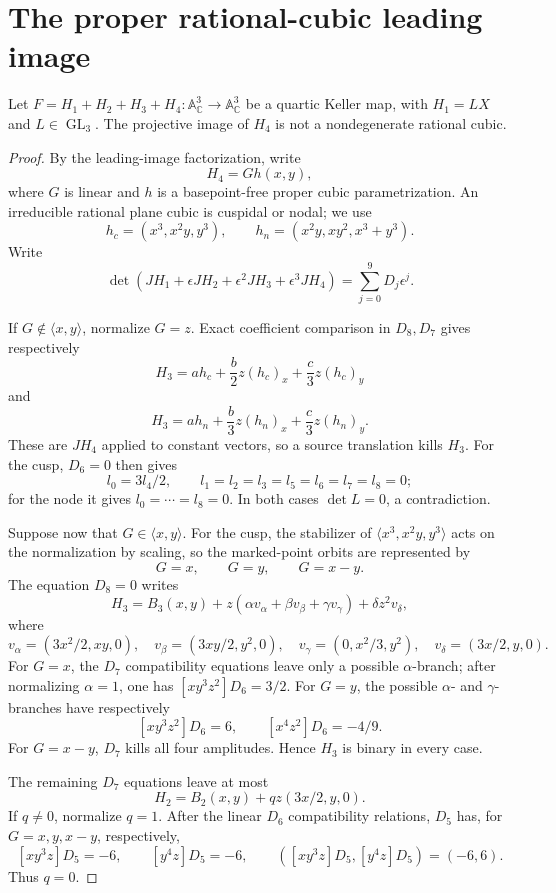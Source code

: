 \section{The proper rational-cubic leading image}
\label{app:quartic-rational-cubic}

\begin{theorem}
\label{thm:quartic-rational-cubic}
Let $F=H_1+H_2+H_3+H_4:\mathbb A^3_{\mathbb C}\to\mathbb A^3_{\mathbb C}$
be a quartic Keller map, with $H_1=LX$ and $L\in\operatorname{GL}_3$.
The projective image of $H_4$ is not a nondegenerate rational cubic.
\end{theorem}

\begin{proof}
By the leading-image factorization, write
\[
 H_4=G h(x,y),
\]
where $G$ is linear and $h$ is a basepoint-free proper cubic
parametrization.  An irreducible rational plane cubic is cuspidal or nodal;
we use
\[
 h_c=(x^3,x^2y,y^3),\qquad
 h_n=(x^2y,xy^2,x^3+y^3).
\]
Write
\[
 \det(JH_1+\epsilon JH_2+\epsilon^2JH_3+\epsilon^3JH_4)
 =\sum_{j=0}^9D_j\epsilon^j.
\]

If $G\notin\langle x,y\rangle$, normalize $G=z$.  Exact coefficient
comparison in $D_8,D_7$ gives respectively
\[
 H_3=a h_c+\frac b2z(h_c)_x+\frac c3z(h_c)_y
\]
and
\[
 H_3=a h_n+\frac b3z(h_n)_x+\frac c3z(h_n)_y.
\]
These are $JH_4$ applied to constant vectors, so a source translation kills
$H_3$.  For the cusp, $D_6=0$ then gives
\[
 l_0=3l_4/2,
 \qquad l_1=l_2=l_3=l_5=l_6=l_7=l_8=0;
\]
for the node it gives $l_0=\cdots=l_8=0$.  In both cases
$\det L=0$, a contradiction.

Suppose now that $G\in\langle x,y\rangle$.  For the cusp, the stabilizer of
$\langle x^3,x^2y,y^3\rangle$ acts on the normalization by scaling, so the
marked-point orbits are represented by
\[
 G=x,\qquad G=y,\qquad G=x-y.
\]
The equation $D_8=0$ writes
\[
H_3=B_3(x,y)+z(\alpha v_\alpha+\beta v_\beta+\gamma v_\gamma)
              +\delta z^2v_\delta,
\]
where
\[
 v_\alpha=(3x^2/2,xy,0),\quad
 v_\beta=(3xy/2,y^2,0),\quad
 v_\gamma=(0,x^2/3,y^2),\quad
 v_\delta=(3x/2,y,0).
\]
For $G=x$, the $D_7$ compatibility equations leave only a possible
$\alpha$-branch; after normalizing $\alpha=1$, one has
$[xy^3z^2]D_6=3/2$.  For $G=y$, the possible $\alpha$- and $\gamma$-branches
have respectively
\[
 [xy^3z^2]D_6=6,
 \qquad [x^4z^2]D_6=-4/9.
\]
For $G=x-y$, $D_7$ kills all four amplitudes.  Hence $H_3$ is binary in
every case.

The remaining $D_7$ equations leave at most
\[
 H_2=B_2(x,y)+qz(3x/2,y,0).
\]
If $q\ne0$, normalize $q=1$.  After the linear $D_6$ compatibility
relations, $D_5$ has, for $G=x,y,x-y$, respectively,
\[
 [xy^3z]D_5=-6,
 \qquad [y^4z]D_5=-6,
 \qquad ([xy^3z]D_5,[y^4z]D_5)=(-6,6).
\]
Thus $q=0$.


\end{proof}
